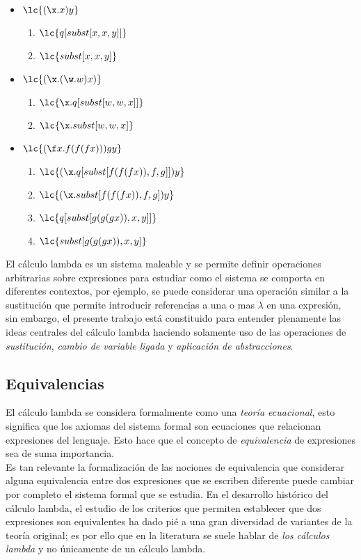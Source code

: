 \begin{itemize}
\item \(\lc{(\x.x)y}\)
  \begin{enumerate}
  \item \(\lc{q[subst[x,x,y]]}\)
  \item \(\lc{subst[x,x,y]}\)
  \end{enumerate}
\item \(\lc{(\x.(\w.w)x)}\)
  \begin{enumerate}
  \item \(\lc{\x.q[subst[w,w,x]]}\)
  \item \(\lc{\x.subst[w,w,x]}\)
  \end{enumerate}
\item \(\lc{(\f x.f(f(f x)))g y}\)
  \begin{enumerate}
  \item \(\lc{(\x.q[subst[f(f(f x)), f, g]]) y}\)
  \item \(\lc{(\x.subst[f(f(f x)), f, g]) y}\)
  \item \(\lc{q[subst[g(g(g x)), x, y]]}\)
  \item \(\lc{subst[g(g(g x)), x, y]}\)
  \end{enumerate}
\end{itemize}

El cálculo lambda es un sistema maleable y se permite definir operaciones
arbitrarias sobre expresiones para estudiar como el sistema se comporta en
diferentes contextos, por ejemplo, se puede considerar una operación similar a
la sustitución que permite introducir referencias a una o mas \(\lambda\) en una
expresión, sin embargo, el presente trabajo está constituido para entender
plenamente las ideas centrales del cálculo lambda haciendo solamente uso de las
operaciones de \emph{sustitución}, \emph{cambio de variable ligada} y
\emph{aplicación de abstracciones}. \\

\subsection{Equivalencias}

El cálculo lambda se considera formalmente como una \emph{teoría ecuacional},
esto significa que los axiomas del sistema formal son ecuaciones que relacionan
expresiones del lenguaje. Esto hace que el concepto de \emph{equivalencia} de
expresiones sea de suma importancia. \\

Es tan relevante la formalización de las nociones de equivalencia que considerar
alguna equivalencia entre dos expresiones que se escriben diferente puede cambiar
por completo el sistema formal que se estudia. En el desarrollo histórico del
cálculo lambda, el estudio de los criterios que permiten establecer que dos
expresiones son equivalentes ha dado pié a una gran diversidad de variantes de la
teoría original; es por ello que en la literatura se suele hablar de \emph{los
cálculos lambda} y no únicamente de un cálculo lambda. \\

